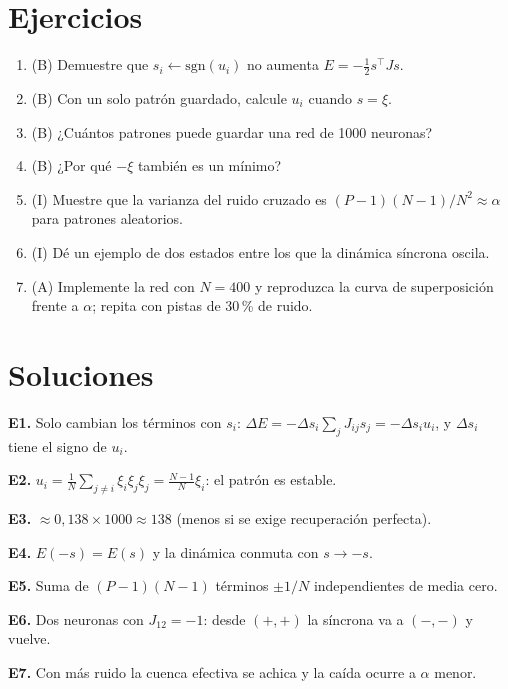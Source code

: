 \documentclass[11pt,a4paper]{article}
\begin{document}
\section{Ejercicios}
\begin{enumerate}[label=\textbf{E\arabic*.}]
\item (B) Demuestre que $s_i\leftarrow\mathrm{sgn}(u_i)$ no aumenta $E=-\tfrac12s^\top Js$.
\item (B) Con un solo patrón guardado, calcule $u_i$ cuando $s=\xi$.
\item (B) ¿Cuántos patrones puede guardar una red de 1000 neuronas?
\item (B) ¿Por qué $-\xi$ también es un mínimo?
\item (I) Muestre que la varianza del ruido cruzado es $(P-1)(N-1)/N^2\approx\alpha$ para patrones aleatorios.
\item (I) Dé un ejemplo de dos estados entre los que la dinámica síncrona oscila.
\item (A) Implemente la red con $N=400$ y reproduzca la curva de superposición frente a $\alpha$; repita con pistas de 30\,\% de ruido.
\end{enumerate}
\section{Soluciones}
\begin{solucion}
\textbf{E1.} Solo cambian los términos con $s_i$: $\Delta E=-\Delta s_i\sum_jJ_{ij}s_j=-\Delta s_iu_i$, y $\Delta s_i$ tiene el signo de $u_i$.

\textbf{E2.} $u_i=\frac1N\sum_{j\ne i}\xi_i\xi_j\xi_j=\frac{N-1}N\xi_i$: el patrón es estable.

\textbf{E3.} $\approx0{,}138\times1000\approx138$ (menos si se exige recuperación perfecta).

\textbf{E4.} $E(-s)=E(s)$ y la dinámica conmuta con $s\to-s$.

\textbf{E5.} Suma de $(P-1)(N-1)$ términos $\pm1/N$ independientes de media cero.

\textbf{E6.} Dos neuronas con $J_{12}=-1$: desde $(+,+)$ la síncrona va a $(-,-)$ y vuelve.

\textbf{E7.} Con más ruido la cuenca efectiva se achica y la caída ocurre a $\alpha$ menor.
\end{solucion}
\end{document}

